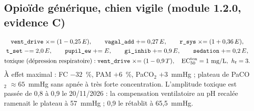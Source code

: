 \documentclass[10pt,a4paper]{article}
\newcommand{\vp}[1]{\text{\texttt{\detokenize{#1}}}}
\begin{document}
\subsection{Opioïde générique, chien vigile (module 1.2.0, evidence C)}
\begin{gather}
\vp{vent_drive} \mathrel{\times}= (1 - 0{,}25\,E),\qquad \vp{vagal_add} \mathrel{+}= 0{,}27\,E,\qquad \vp{r_sys} \mathrel{\times}= (1 + 0{,}36\,E),\\
\vp{t_set} \mathrel{-}= 2{,}0\,E,\qquad \vp{pupil_ew} \mathrel{+}= E,\qquad \vp{gi_inhib} \mathrel{+}= 0{,}9\,E,\qquad \vp{sedation} \mathrel{+}= 0{,}2\,E,\\
\text{toxique (dépression respiratoire)} : \vp{vent_drive} \mathrel{\times}= (1 - 0{,}9\,T),\quad \text{EC}_{50}^\text{tox} = 1~\text{mg/L},\ h_t = 3.
\end{gather}
À effet maximal : FC $-32$~\%, PAM $+6$~\%, PaCO$_2$ $+3$~mmHg ; plateau de PaCO$_2$ $\approx 65$~mmHg sans apnée à très forte concentration. L'amplitude toxique est passée de 0,8 à 0,9 le 20/11/2026 : la compensation ventilatoire au pH recalée ramenait le plateau à 57~mmHg ; 0,9 le rétablit à 65,5~mmHg.
\end{document}
